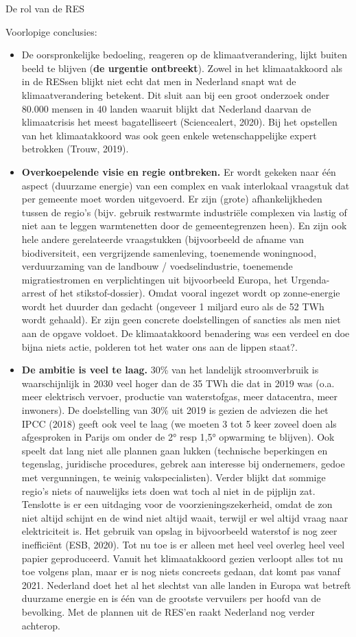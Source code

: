 \begin{voorstel}{De rol van de RES}
\begin{uitdaging}
Voorlopige conclusies:  
\begin{itemize}
	\item De oorspronkelijke bedoeling, reageren op de klimaatverandering, lijkt buiten beeld te blijven (\textbf{de urgentie ontbreekt}). Zowel in het klimaatakkoord als in de RESsen blijkt niet echt dat men in Nederland snapt wat de klimaatverandering betekent. Dit sluit aan bij een groot onderzoek onder 80.000 mensen in 40 landen waaruit blijkt dat Nederland daarvan de klimaatcrisis het meest bagatelliseert (Sciencealert, 2020). Bij het opstellen van het klimaatakkoord was ook geen enkele wetenschappelijke expert betrokken (Trouw, 2019).
	\item \textbf{Overkoepelende visie en regie ontbreken.} Er wordt gekeken naar één aspect (duurzame energie) van een complex en vaak interlokaal vraagstuk dat per gemeente moet worden uitgevoerd. Er zijn (grote) afhankelijkheden tussen de regio’s (bijv. gebruik restwarmte industriële complexen via lastig of niet aan te leggen warmtenetten door de gemeentegrenzen heen). En zijn ook hele andere gerelateerde vraagstukken (bijvoorbeeld de afname van biodiversiteit, een vergrijzende samenleving, toenemende woningnood, verduurzaming van de landbouw / voedselindustrie, toenemende migratiestromen en verplichtingen uit bijvoorbeeld Europa, het Urgenda-arrest of het stikstof-dossier). Omdat vooral ingezet wordt op zonne-energie wordt het duurder dan gedacht (ongeveer 1 miljard euro als de 52 TWh wordt gehaald). Er zijn geen concrete doelstellingen of sancties als men niet aan de opgave voldoet. De klimaatakkoord benadering was een verdeel en doe bijna niets actie, polderen tot het water ons aan de lippen staat?.
	\item \textbf{De ambitie is veel te laag.} 30\% van het landelijk stroomverbruik is waarschijnlijk in 2030 veel hoger dan de 35 TWh die dat in 2019 was (o.a. meer elektrisch vervoer, productie van waterstofgas, meer datacentra, meer inwoners). De doelstelling van 30\% uit 2019 is gezien de adviezen die het IPCC (2018) geeft ook veel te laag (we moeten 3 tot 5 keer zoveel doen als afgesproken in Parijs om onder de 2° resp 1,5° opwarming te blijven). Ook speelt dat lang niet alle plannen gaan lukken (technische beperkingen en tegenslag, juridische procedures, gebrek aan interesse bij ondernemers, gedoe met vergunningen, te weinig vakspecialisten). Verder blijkt dat sommige regio’s niets of nauwelijks iets doen wat toch al niet in de pijplijn zat. Tenslotte is er een uitdaging voor de voorzieningszekerheid, omdat de zon niet altijd schijnt en de wind niet altijd waait, terwijl er wel altijd vraag naar elektriciteit is. Het gebruik van opslag in bijvoorbeeld waterstof is nog zeer inefficiënt (ESB, 2020). Tot nu toe is er alleen met heel veel overleg heel veel papier geproduceerd. Vanuit het klimaatakkoord gezien verloopt alles tot nu toe volgens plan, maar er is nog niets concreets gedaan, dat komt pas vanaf 2021. Nederland doet het al het slechtst van alle landen in Europa wat betreft duurzame energie en is één van de grootste vervuilers per hoofd van de bevolking. Met de plannen uit de RES’en raakt Nederland nog verder achterop.

\end{itemize}
\end{uitdaging}
\end{voorstel}
